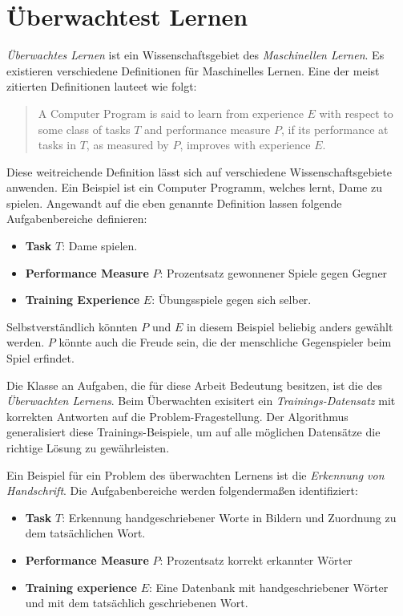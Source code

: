 \chapter{Überwachtest Lernen}
\label{sec:learning}

\emph{Überwachtes Lernen} ist ein Wissenschaftsgebiet des \emph{Maschinellen Lernen}. Es existieren verschiedene Definitionen für Maschinelles Lernen. Eine der meist zitierten Definitionen lauteet wie folgt:

\begin{quote}
	A Computer Program is said to learn from experience $E$ with respect to some class of tasks $T$ and performance measure $P$, if its performance at tasks in $T$, as measured by $P$, improves with experience $E$.\cite[S. 2]{machine_mitchell}
\end{quote}

Diese weitreichende Definition lässt sich auf verschiedene Wissenschaftsgebiete anwenden. Ein Beispiel ist ein Computer Programm, welches lernt, Dame zu spielen. Angewandt auf die eben genannte Definition lassen folgende Aufgabenbereiche definieren:

\begin{itemize}
\item \textbf{Task} $T$: Dame spielen.
\item \textbf{Performance Measure} $P$: Prozentsatz gewonnener Spiele gegen Gegner
\item \textbf{Training Experience} $E$: Übungsspiele gegen sich selber.
\end{itemize}

Selbstverständlich könnten $P$ und $E$ in diesem Beispiel beliebig anders gewählt werden. $P$ könnte auch die Freude sein, die der menschliche Gegenspieler beim Spiel erfindet. \cite[S. 2 -3 ]{machine_mitchell}

Die Klasse an Aufgaben, die für diese Arbeit Bedeutung besitzen, ist die des \emph{Überwachten Lernens}. Beim Überwachten exisitert ein \emph{Trainings-Datensatz} mit korrekten Antworten auf die Problem-Fragestellung. Der Algorithmus generalisiert diese Trainings-Beispiele, um auf alle möglichen Datensätze die richtige Lösung zu gewährleisten. \cite[S 6]{machine_marsland}

Ein Beispiel für ein Problem des überwachten Lernens ist die \emph{Erkennung von Handschrift}. Die Aufgabenbereiche werden folgendermaßen identifiziert: 

\begin{itemize}
	\item \textbf{Task} $T$: Erkennung handgeschriebener Worte in Bildern und Zuordnung zu dem tatsächlichen Wort. 
	\item \textbf{Performance Measure} $P$: Prozentsatz korrekt erkannter Wörter
	\item \textbf{Training experience} $E$: Eine Datenbank mit handgeschriebener Wörter und mit dem tatsächlich geschriebenen Wort. \cite[S. 3 - 4]{machine_mitchell}
\end{itemize}

